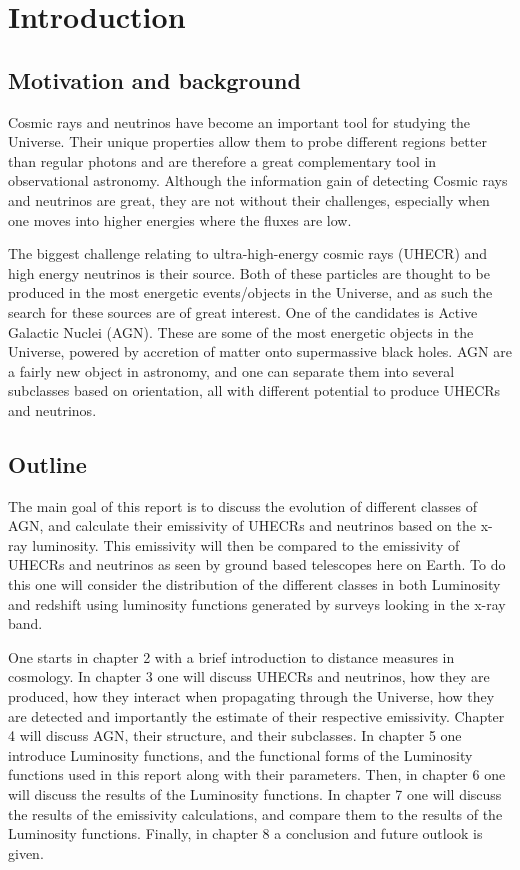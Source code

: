 \section{Introduction}
\subsection{Motivation and background}
Cosmic rays and neutrinos have become an important tool 
for studying the Universe. Their unique properties allow them to probe different regions better than
regular photons and are therefore a great complementary tool in observational astronomy. 
Although the information gain of detecting Cosmic rays and neutrinos are great, they are not without their challenges, 
especially when one moves into higher energies where the fluxes are low.  

The biggest challenge relating to ultra-high-energy cosmic rays (UHECR) and high energy neutrinos is their source.
Both of these particles are thought to be produced in the most energetic events/objects in the Universe, and as such the search for these 
sources are of great interest. One of the candidates is Active Galactic Nuclei (AGN). These are some of the most energetic objects in the Universe, powered by 
accretion of matter onto supermassive black holes. AGN are a fairly new object in astronomy, and one can separate them into several subclasses based on orientation, all with different potential
to produce UHECRs and neutrinos. 


\subsection{Outline}
The main goal of this report is to discuss the evolution of different classes of AGN, and calculate their emissivity of UHECRs and neutrinos based on the x-ray luminosity.
This emissivity will then be compared to the emissivity of UHECRs and neutrinos as seen by ground based 
telescopes here on Earth. To do this one will consider the distribution of the different classes in both Luminosity and redshift using luminosity functions generated by surveys looking in the x-ray band.

One starts in chapter 2 with a brief introduction to distance measures in cosmology. In chapter 3 one will discuss UHECRs and neutrinos, how they are produced, how they interact when propagating through the Universe, how they are detected and importantly the estimate of their respective emissivity.
Chapter 4 will discuss AGN, their structure, and their subclasses. In chapter 5 one introduce Luminosity functions, and the functional forms of the Luminosity functions used in this report along with their parameters.
Then, in chapter 6 one will discuss the results of the Luminosity functions. In chapter 7 one will discuss the results of the emissivity calculations, and compare them to the results of the Luminosity functions. 
Finally, in chapter 8 a conclusion and future outlook is given. 